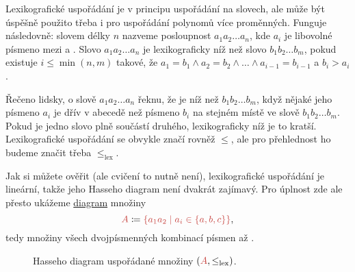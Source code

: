Lexikografické uspořádání je v principu uspořádání na slovech, ale může být
úspěšně použito třeba i pro uspořádání polynomů více proměnných. Funguje
následovně: slovem délky $n$ nazveme posloupnost $a_1a_2\ldots a_n$, kde $a_i$
je libovolné písmeno mezi  a . Slovo $a_1a_2\ldots a_n$ je
lexikograficky níž než slovo $b_1b_2\ldots b_m$, pokud existuje $i \leq
\min(n,m)$ takové, že $a_1 = b_1 \wedge a_2 = b_2 \wedge \ldots \wedge a_{i-1} =
b_{i-1}$ a $b_i > a_i$.

Řečeno lidsky, o slově $a_1a_2\ldots a_n$ řeknu, že je níž než $b_1b_2\ldots
b_m$, když nějaké jeho písmeno $a_i$ je dřív v abecedě než písmeno $b_i$ na
stejném místě ve slově $b_1b_2\ldots b_m$. Pokud je jedno slovo plně součástí
druhého, lexikograficky níž je to kratší. Lexikografické uspořádání se obvykle
značí rovněž $ \leq $, ale pro přehlednost ho budeme značit třeba
$\leq_{\text{lex}}$.

\begin{example}
 Jak si můžete ověřit (ale cvičení to nutně není), lexikografické uspořádání je
 lineární, takže jeho Hasseho diagram není dvakrát zajímavý. Pro úplnost zde
 ale přesto ukážeme \hyperref[fig:hasse-lex]{diagram} množiny
 \[
  \clr{A} \coloneqq \clr{\{a_1a_2 \mid a_i \in \{a,b,c\}\}},
 \]
 tedy množiny všech dvojpísmenných kombinací písmen  až .
 \begin{figure}[H]
  \centering
  \caption{Hasseho diagram uspořádané množiny $(\clr{A}, \leq_{\text{lex}})$.}
  \label{fig:hasse-lex}
 \end{figure}
\end{example}
